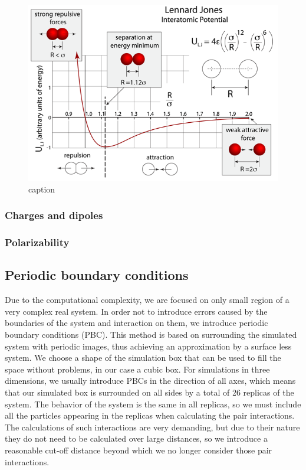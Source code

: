 \begin{figure}[htb!]
	\centering
	\includegraphics[width=1.0\linewidth]{img/lj.png} 
	\caption{caption}
	\label{fig:lj}    
\end{figure} 

\subsubsection{Charges and dipoles}

\subsubsection{Polarizability}



\subsection{Periodic boundary conditions}
Due to the computational complexity, we are focused on only small region of a very complex real system.  In order not to introduce errors caused by the boundaries of the system and interaction on them, we introduce periodic boundary conditions (PBC). This method is based on surrounding the simulated system with periodic images, thus achieving an approximation by a surface less system. We choose a shape of the simulation box that can be used to fill the space without problems, in our case a cubic box. For simulations in three dimensions, we usually introduce PBCs in the direction of all axes, which means that our simulated box is surrounded on all sides by a total of 26 replicas of the system. The behavior of the system is the same in all replicas, so we must include all the particles appearing in the replicas when calculating the pair interactions. The calculations of such interactions are very demanding, but due to their nature they do not need to be calculated over large distances, so we introduce a reasonable cut-off distance beyond which we no longer consider those pair interactions.

